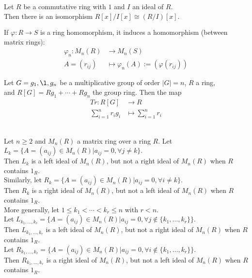 \begin{remark}
Let $R$ be a commutative ring with $1$ and $I$ an ideal of $R$.\\
Then there is an isomorphism $R[x]/I[x] \cong (R/I)[x]$.\\	
\end{remark}


\begin{remark}
If $\varphi: R \rightarrow S$ is a ring homomorphism, it induces a homomorphism (between matrix rings):
\begin{align}
\varphi_n: M_n(R) &\rightarrow M_n(S) \nonumber \\
A = (r_{ij}) &\mapsto \varphi_n(A) := (\varphi(r_{ij})) \nonumber
\end{align}
\end{remark}


\begin{remark}
Let $G={g_1, \l , g_n}$ be a multiplicative group of order $\left| G \right| = n$, $R$ a ring, \\
and $R[G]=Rg_1 + \cdots + Rg_n$ the group ring. Then the map 
\begin{align}
Tr: R[G] &\rightarrow R \nonumber \\
\sum_{i=1}^{n} r_i g_i &\mapsto \sum_{i=1}^{n} r_i \nonumber
\end{align}
\end{remark}


\begin{remark}
\\
Let $n \geq 2$ and $M_n(R)$ a matrix ring over a ring $R$. Let $L_k = \{A = (a_{ij}) \in M_n(R) | a_{ij} = 0, \forall j \neq k\}$.\\
Then $L_k$ is a left ideal of $M_n(R)$, but not a right ideal of $M_n(R)$ when $R$ contains $1_R$.\\
Similarly, let $R_k = \{A = (a_{ij}) \in M_n(R) | a_{ij} = 0, \forall i \neq k\}$.\\
Then $R_k$ is a right ideal of $M_n(R)$, but not a left ideal of $M_n(R)$ when $R$ contains $1_R$.\\
More generally, let $1 \leq k_1 < \cdots < k_r \leq n$ with $r < n$.\\
Let $L_{k_1, \ldots, k_r} = \{A = (a_{ij}) \in M_n(R) | a_{ij} = 0, \forall j \notin \{k_1, \ldots, k_r\}\}$.\\
Then $L_{k_1, \ldots, k_r}$ is a left ideal of $M_n(R)$, but not a right ideal of $M_n(R)$ when $R$ contains $1_R$.\\
Let $R_{k_1, \ldots, k_r} = \{A = (a_{ij}) \in M_n(R) | a_{ij} = 0, \forall i \notin \{k_1, \ldots, k_r\}\}$.\\
Then $R_{k_1, \ldots, k_r}$ is a right ideal of $M_n(R)$, but not a left ideal of $M_n(R)$ when $R$ contains $1_R$.\\
\end{remark}


